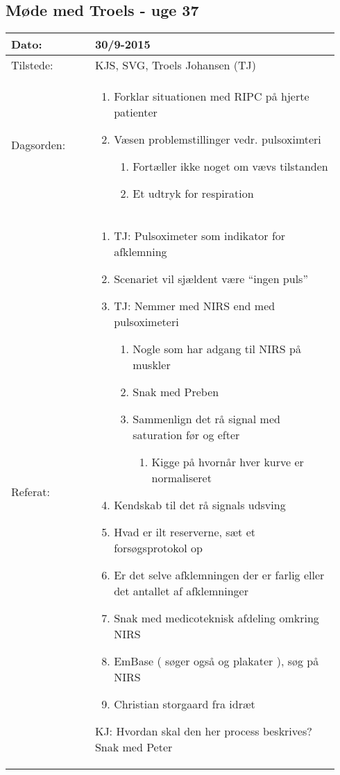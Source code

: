 	\subsection{Møde med Troels - uge 37}
	\begin{longtable}{|p{0.24\linewidth}|p{0.7\linewidth}|}
		\hline
		Dato: & 30/9-2015\\ \hline
		Tilstede: & KJS, SVG, Troels Johansen (TJ) \\ \hline
		Dagsorden: &
		\begin{enumerate}
			\item Forklar situationen med RIPC på hjerte patienter
			\item Væsen problemstillinger vedr. pulsoximteri
			\begin{enumerate}
				\item Fortæller ikke noget om vævs tilstanden
				\item Et udtryk for respiration 
			\end{enumerate}
		\end{enumerate}
		\\ \hline
		Referat: & 
		\begin{enumerate}
			\item TJ: Pulsoximeter som indikator for afklemning
			\item Scenariet vil sjældent være “ingen puls” 
			\item TJ: Nemmer med NIRS end med pulsoximeteri 
			\begin{enumerate}
				\item Nogle som har adgang til NIRS på muskler
				\item Snak med Preben
				\item Sammenlign det rå signal med saturation før og efter
				\begin{enumerate}
					\item Kigge på hvornår hver kurve er normaliseret 
				\end{enumerate}
			\end{enumerate}
			\item Kendskab til det rå signals udsving
			\item Hvad er ilt reserverne, sæt et forsøgsprotokol op
			\item Er det selve afklemningen der er farlig eller det antallet af afklemninger 
			\item Snak med medicoteknisk afdeling omkring NIRS 
			\item EmBase ( søger også og plakater ), søg på NIRS 
			\item Christian storgaard fra idræt
		\end{enumerate}
		KJ: Hvordan skal den her process beskrives? Snak med Peter 
		\\ \hline
	\end{longtable}
	
